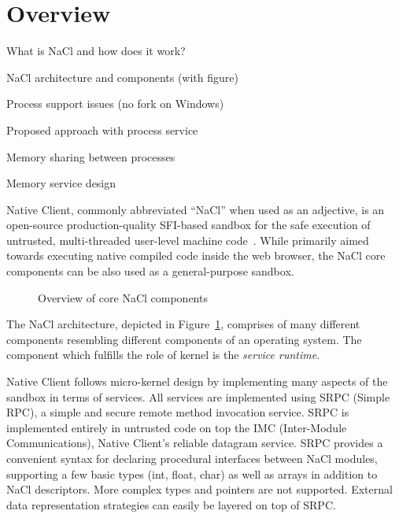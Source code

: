 \section{Overview}
\label{sec:overview}

\begin{structure}
  \item What is NaCl and how does it work?
  \item NaCl architecture and components (with figure)
  \item Process support issues (\eg no fork on Windows)
  \item Proposed approach with process service
  \item Memory sharing between processes
  \item Memory service design
\end{structure}

Native Client, commonly abbreviated ``NaCl'' when used as an adjective,
is an open-source production-quality SFI-based sandbox for the safe
execution of untrusted, multi-threaded user-level machine
code~\cite{yee:ieee-sp09,sehr:usenix-sec10,ansel:pldi11}. While
primarily aimed towards executing native compiled code inside the web
browser, the NaCl core components can be also used as a
general-purpose sandbox.

\begin{figure}
\centering
\caption{Overview of core NaCl components}
\label{fig:architecture}
\end{figure}

The NaCl architecture, depicted in Figure~\ref{fig:architecture},
comprises of many different components resembling different components
of an operating system. The component which fulfills the role of kernel
is the \emph{service runtime}.

Native Client follows micro-kernel design by implementing many aspects
of the sandbox in terms of services. All services are implemented using
SRPC (Simple RPC), a simple and secure remote method invocation
service. SRPC is implemented entirely in untrusted code on top the IMC
(Inter-Module Communications), Native Client's reliable datagram
service. SRPC provides a convenient syntax for declaring procedural
interfaces between NaCl modules, supporting a few basic types (int,
float, char) as well as arrays in addition to NaCl descriptors.  More
complex types and pointers are not supported.  External data
representation strategies can easily be layered on top of SRPC.


